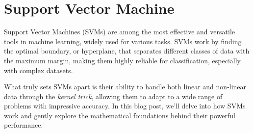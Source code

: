 \chapter{Support Vector Machine}
Support Vector Machines (SVMs) are among the most effective and versatile tools in machine learning, widely used for various tasks. SVMs work by finding the optimal boundary, or hyperplane, that separates different classes of data with the maximum margin, making them highly reliable for classification, especially with complex datasets.

What truly sets SVMs apart is their ability to handle both linear and non-linear data through the \textit{kernel trick}, allowing them to adapt to a wide range of problems with impressive accuracy. In this blog post, we'll delve into how SVMs work and gently explore the mathematical foundations behind their powerful performance.



